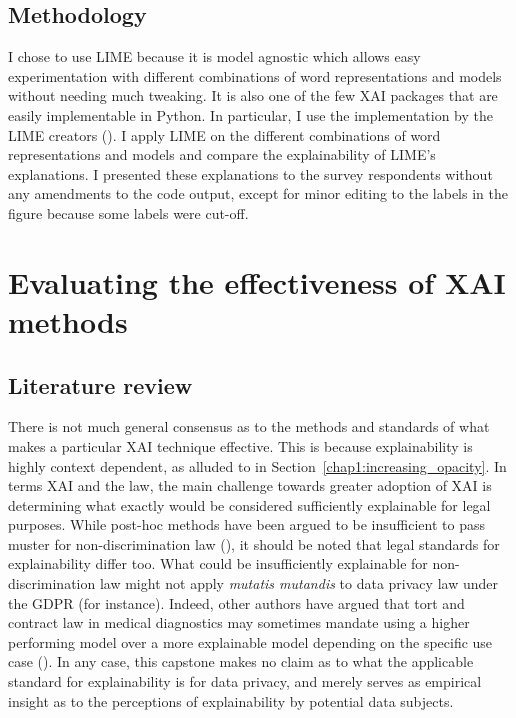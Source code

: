 \subsection{Methodology}
I chose to use LIME because it is model agnostic which allows easy experimentation with different combinations of word representations and models without needing much tweaking. It is also one of the few XAI packages that are easily implementable in Python. In particular, I use the implementation by the LIME creators (\cite{lime_github}). I apply LIME on the different combinations of word representations and models and compare the explainability of LIME's explanations. I presented these explanations to the survey respondents without any amendments to the code output, except for minor editing to the labels in the figure because some labels were cut-off.

\section{Evaluating the effectiveness of XAI methods}
\subsection{Literature review}
There is not much general consensus as to the methods and standards of what makes a particular XAI technique effective. This is because explainability is highly context dependent, as alluded to in Section~\ref{chap1:increasing_opacity}. In terms XAI and the law, the main challenge towards greater adoption of XAI is determining what exactly would be considered sufficiently explainable for legal purposes. While post-hoc methods have been argued to be insufficient to pass muster for non-discrimination law (\cite{vale2022explainable}), it should be noted that legal standards for explainability differ too. What could be insufficiently explainable for non-discrimination law might not apply \textit{mutatis mutandis} to data privacy law under the GDPR (for instance). Indeed, other authors have argued that tort and contract law in medical diagnostics may sometimes mandate using a higher performing model over a more explainable model depending on the specific use case (\cite{hacker2020explainable}). In any case, this capstone makes no claim as to what the applicable standard for explainability is for data privacy, and merely serves as empirical insight as to the perceptions of explainability by potential data subjects.

